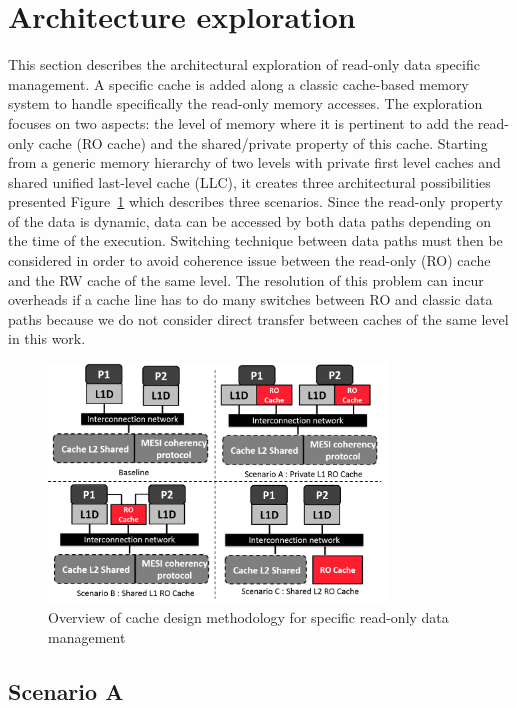\documentclass[sigconf]{acmart}
\begin{document}
\section{Architecture exploration}

This section describes the architectural exploration of read-only data
specific management. A specific cache is added along a classic
cache-based memory system to handle specifically the read-only memory
accesses. The exploration focuses on two aspects: the level of memory
where it is pertinent to add the read-only cache (RO cache) and the
shared/private property of this cache. Starting from a generic memory
hierarchy of two levels with private first level caches and shared
unified last-level cache (LLC), it creates three architectural
possibilities presented Figure~\ref{architecture} which describes
three scenarios. Since the read-only property of the data is dynamic,
data can be accessed by both data paths depending on the time of the
execution. Switching technique between data paths must then be
considered in order to avoid coherence issue between the read-only
(RO) cache and the RW cache of the same level. The resolution of this
problem can incur overheads if a cache line has to do many switches
between  RO and  classic data paths because we do not consider
direct transfer between caches of the same level in this work.


\begin{figure}
    \centering
    \includegraphics[width=9cm]{./images/architecture.png}
    \caption{Overview of cache design methodology for specific read-only data management}
    \label{architecture}
\end{figure}

\subsection{Scenario A}
\end{document}
